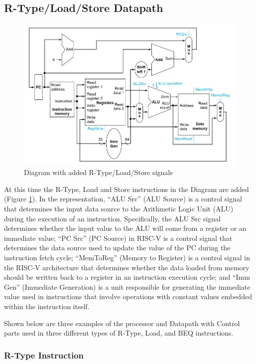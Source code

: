         \subsection{R-Type/Load/Store Datapath}

            \begin{figure}[!h]
            \centering
            \includegraphics[width = 0.8
            \textwidth]{figures/riscv/risc_3.jpg}
                \caption{\label{risc_3} Diagram with added R-Type/Load/Store signals}
            \end{figure}

            At this time the R-Type, Load and Store instructions in the Diagram are added (Figure \ref{risc_3}). In the representation, ``ALU Src'' (ALU Source) is a control signal that determines the input data source to the Arithmetic Logic Unit (ALU) during the execution of an instruction. Specifically, the ALU Src signal determines whether the input value to the ALU will come from a register or an immediate value; ``PC Src'' (PC Source) in RISC-V is a control signal that determines the data source used to update the value of the PC during the instruction fetch cycle; ``MemToReg'' (Memory to Register) is a control signal in the RISC-V architecture that determines whether the data loaded from memory should be written back to a register in an instruction execution cycle; and ``Imm Gen'' (Immediate Generation) is a unit responsible for generating the immediate value used in instructions that involve operations with constant values embedded within the instruction itself.
    
            Shown below are three examples of the processor and Datapath with Control parts used in three different types of R-Type, Load, and BEQ instructions. 
        
            \subsubsection{R-Type Instruction}
        
